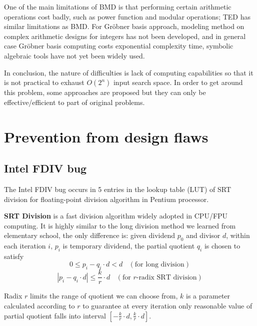 \documentclass[11pt,twoside, onecolumn]{IEEEtran}
\begin{document}
One of the main limitations of BMD is that performing certain arithmetic operations cost badly,
such as power function and modular operations; TED has similar limitations as BMD. For Gr\"obner
basis approach, modeling method on complex arithmetic designs for integers has not been developed,
and in general case Gr\"obner basis computing costs exponential complexity time, symbolic algebraic 
tools have not yet been widely used.

In conclusion, the nature of difficulties is lack of computing capabilities so that it is 
not practical to exhaust $O(2^n)$ input search space. In order to get around this problem,
some approaches are proposed but they can only be effective/efficient to part of original 
problems.

\section{Prevention from design flaws}
\subsection{Intel FDIV bug}
The Intel FDIV bug occurs in 5 entries in the lookup table (LUT) of SRT division for floating-point
division algorithm in Pentium processor.

{\bf SRT Division} is a fast division algorithm widely adopted in CPU/FPU computing.
It is highly similar to the long division method we learned from elementary school,
the only difference is:
given dividend $p_0$ and divisor $d$, within each iteration $i$, $p_i$ is temporary 
dividend, the partial quotient
$q_i$ is chosen to satisfy
$$0\leq p_i - q_i\cdot d < d \ \ \ \ (\text{for long division})$$
$$|p_i - q_i\cdot d| \leq \frac{k}{r}\cdot d\ \ \ \ (\text{for $r$-radix SRT division})$$

Radix $r$ limits the range of quotient we can choose from, $k$ is a parameter
calculated according to $r$ to guarantee at every iteration only reasonable value of partial quotient
falls into interval $[-\frac{k}{r}\cdot d, \frac{k}{r}\cdot d]$.
\end{document}
